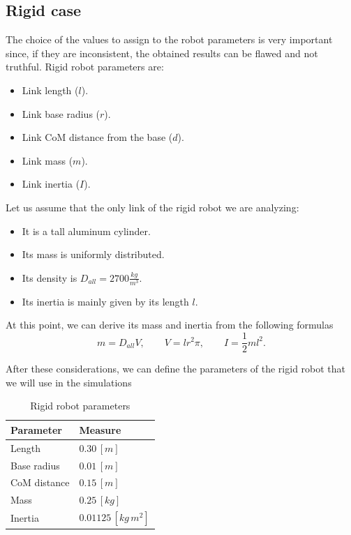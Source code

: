 \documentclass[a4paper]{article}
\begin{document}
\subsection{Rigid case}
\label{sub:rig_sims}
The choice of the values to assign to the robot parameters is very important since, if they are inconsistent, the obtained results can be flawed and not truthful. Rigid robot parameters are:
\begin{itemize}
    \item Link length ($l$).
    \item Link base radius ($r$).
    \item Link CoM distance from the base ($d$).
    \item Link mass ($m$).
    \item Link inertia ($I$).
\end{itemize}

Let us assume that the only link of the rigid robot we are analyzing: 
\begin{itemize}
    \item It is a tall aluminum cylinder.
    \item Its mass is uniformly distributed.
    \item Its density is $D_{all}=2700 \frac{kg}{m^3}$.
    \item Its inertia is mainly given by its length $l$.
\end{itemize} 
At this point, we can derive its mass and inertia from the following formulas
\begin{equation}
    \label{eq:cilinder}
    m=D_{all}V, \qquad  V=lr^2\pi, \qquad    I=\frac{1}{2}ml^2.
\end{equation}

After these considerations, we can define the parameters of the rigid robot that we will use in the simulations

\begin{table}
\centering
\caption{Rigid robot parameters}
\begin{tabular}{P{2.5cm}P{2.5cm}} 
\hline\hline
 \textbf{Parameter} & \textbf{Measure} \\ 
\hline
 Length & $0.30\, [m]$\\ 
\hline
 Base radius & $0.01\, [m]$\\ 
\hline
 CoM distance & $0.15\, [m]$\\ 
\hline
 Mass & $0.25\, [kg]$\\
\hline
 Inertia & $0.01125\, [kg\,m^2]$\\
\hline\hline
\end{tabular}
\end{table}
\end{document}
